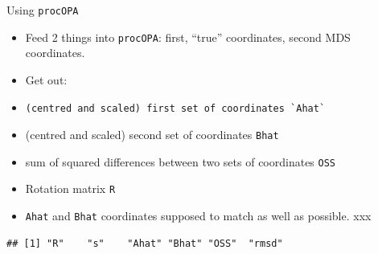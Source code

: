 \documentclass[ignorenonframetext,]{beamer}
\newenvironment{Shaded}{\begin{snugshade}}{\end{snugshade}}
\newcommand{\FloatTok}[1]{\textcolor[rgb]{0.00,0.00,0.81}{#1}}
\newcommand{\KeywordTok}[1]{\textcolor[rgb]{0.13,0.29,0.53}{\textbf{#1}}}
\newcommand{\NormalTok}[1]{#1}
\newcommand{\OperatorTok}[1]{\textcolor[rgb]{0.81,0.36,0.00}{\textbf{#1}}}
\newcommand{\StringTok}[1]{\textcolor[rgb]{0.31,0.60,0.02}{#1}}
\begin{document}
\begin{frame}[fragile]{Using \texttt{procOPA}}
\protect\hypertarget{using-procopa}{}

\begin{itemize}
\item
  Feed 2 things into \texttt{procOPA}: first, ``true'' coordinates,
  second MDS coordinates.
\item
  Get out:
\item
\begin{verbatim}
(centred and scaled) first set of coordinates `Ahat`
\end{verbatim}
\item
  (centred and scaled) second set of coordinates \texttt{Bhat}
\item
  sum of squared differences between two sets of coordinates
  \texttt{OSS}
\item
  Rotation matrix \texttt{R}
\item
  \texttt{Ahat} and \texttt{Bhat} coordinates supposed to match as well
  as possible. xxx
\end{itemize}

\footnotesize

\begin{Shaded}
\end{Shaded}

\begin{verbatim}
## [1] "R"    "s"    "Ahat" "Bhat" "OSS"  "rmsd"
\end{verbatim}

\normalsize

\end{frame}
\end{document}
